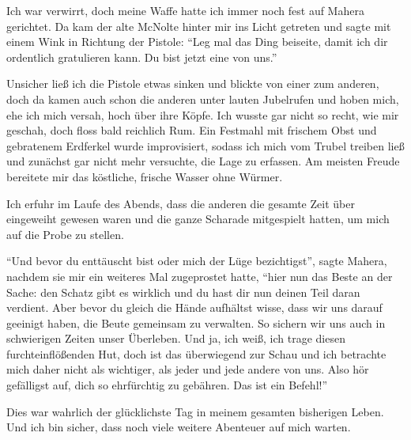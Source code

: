 Ich war verwirrt, doch meine Waffe hatte ich immer noch fest auf Mahera gerichtet. Da kam der alte McNolte hinter mir ins Licht getreten und sagte mit einem Wink in Richtung der Pistole: \enquote{Leg mal das Ding beiseite, damit ich dir ordentlich gratulieren kann. Du bist jetzt eine von uns.}

Unsicher ließ ich die Pistole etwas sinken und blickte von einer zum anderen, doch da kamen auch schon die anderen unter lauten Jubelrufen und hoben mich, ehe ich mich versah, hoch über ihre Köpfe. Ich wusste gar nicht so recht, wie mir geschah, doch floss bald reichlich Rum. Ein Festmahl mit frischem Obst und gebratenem Erdferkel wurde improvisiert, sodass ich mich vom Trubel treiben ließ und zunächst gar nicht mehr versuchte, die Lage zu erfassen. Am meisten Freude bereitete mir das köstliche, frische Wasser ohne Würmer.

Ich erfuhr im Laufe des Abends, dass die anderen die gesamte Zeit über eingeweiht gewesen waren und die ganze Scharade mitgespielt hatten, um mich auf die Probe zu stellen.

\enquote{Und bevor du enttäuscht bist oder mich der Lüge bezichtigst}, sagte Mahera, nachdem sie mir ein weiteres Mal zugeprostet hatte, \enquote{hier nun das Beste an der Sache: den Schatz gibt es wirklich und du hast dir nun deinen Teil daran verdient. Aber bevor du gleich die Hände aufhältst wisse, dass wir uns darauf geeinigt haben, die Beute gemeinsam zu verwalten. So sichern wir uns auch in schwierigen Zeiten unser Überleben. Und ja, ich weiß, ich trage diesen furchteinflößenden Hut, doch ist das überwiegend zur Schau und ich betrachte mich daher nicht als wichtiger, als jeder und jede andere von uns. Also hör gefälligst auf, dich so ehrfürchtig zu gebähren. Das ist ein Befehl!}

Dies war wahrlich der glücklichste Tag in meinem gesamten bisherigen Leben. Und ich bin sicher, dass noch viele weitere Abenteuer auf mich warten.
